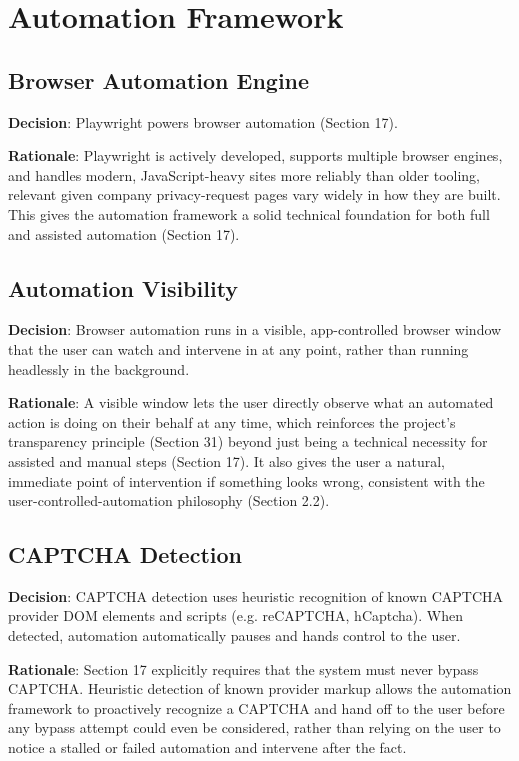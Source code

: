 \chapter{Automation Framework}

\section{Browser Automation Engine}
\textbf{Decision}: Playwright powers browser automation (Section 17).

\textbf{Rationale}: Playwright is actively developed, supports multiple browser engines, and handles modern, JavaScript-heavy sites more reliably than older tooling, relevant given company privacy-request pages vary widely in how they are built. This gives the automation framework a solid technical foundation for both full and assisted automation (Section 17).
\section{Automation Visibility}
\textbf{Decision}: Browser automation runs in a visible, app-controlled browser window that the user can watch and intervene in at any point, rather than running headlessly in the background.

\textbf{Rationale}: A visible window lets the user directly observe what an automated action is doing on their behalf at any time, which reinforces the project's transparency principle (Section 31) beyond just being a technical necessity for assisted and manual steps (Section 17). It also gives the user a natural, immediate point of intervention if something looks wrong, consistent with the user-controlled-automation philosophy (Section 2.2).
\section{CAPTCHA Detection}
\textbf{Decision}: CAPTCHA detection uses heuristic recognition of known CAPTCHA provider DOM elements and scripts (e.g. reCAPTCHA, hCaptcha). When detected, automation automatically pauses and hands control to the user.

\textbf{Rationale}: Section 17 explicitly requires that the system must never bypass CAPTCHA. Heuristic detection of known provider markup allows the automation framework to proactively recognize a CAPTCHA and hand off to the user before any bypass attempt could even be considered, rather than relying on the user to notice a stalled or failed automation and intervene after the fact.
